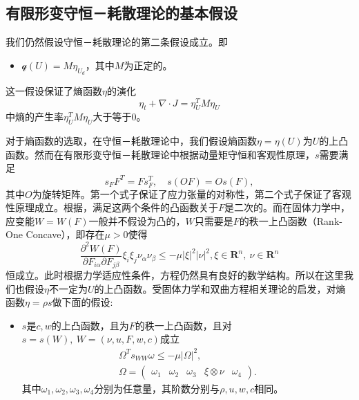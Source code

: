\subsection{有限形变守恒－耗散理论的基本假设}
我们仍然假设守恒－耗散理论的第二条假设成立。即
\begin{itemize}
	\item $\mathcal{q}(U) = M \eta_{U_d}$，其中$M$为正定的。
\end{itemize}
这一假设保证了熵函数$\eta$的演化
\begin{equation}\label{eq:entropypro}
	\eta_t + \nabla \cdot J = \eta_U^T M \eta_U
\end{equation}
中熵的产生率$\eta_U^T M \eta_U$大于等于$0$。

对于熵函数的选取，在守恒－耗散理论中，我们假设熵函数$\eta=\eta(U)$为$U$的上凸函数。然而在有限形变守恒－耗散理论中根据动量矩守恒和客观性原理，$s$需要满足
\begin{equation}\label{eq:sObjective}
	s_F F^T = F s^T_F, \quad s(OF) = O s(F),
\end{equation}
其中$O$为旋转矩阵\cite{dafermos2013non}。第一个式子保证了应力张量的对称性，第二个式子保证了客观性原理成立。根据\cite{ball1976convexity}，满足这两个条件的凸函数关于$F$是二次的。而在固体力学中，应变能$W=W(F)$一般并不假设为凸的，$W$只需要是$F$的秩一上凸函数（Rank-One Concave），即存在$\mu>0$使得
\begin{equation*}
	\frac{\partial^2 W(F)}{\partial F_{i\alpha} \partial F_{j\beta}} \xi_i \xi_j \nu_\alpha \nu_\beta \le -\mu |\xi|^2 |\nu|^2, \xi \in \mathbf{R}^n, \ \nu \in \mathbf{R}^n
\end{equation*}
恒成立。此时根据力学适应性条件，方程仍然具有良好的数学结构。所以在这里我们也假设$\eta$不一定为$U$的上凸函数。受固体力学和双曲方程相关理论的启发，对熵函数$\eta = \rho s$做下面的假设:
\begin{itemize}
	\item $s$是$c,w$的上凸函数，且为$F$的秩一上凸函数，且对$s=s(W),\ W= (\nu,u,F,w,c)$成立
\begin{eqnarray}
	\Omega^T s_{WW} \omega \le -\mu |\Omega|^2, \label{eq:FCDFconvex}\\ 
	\Omega = \left( \begin{array}{cccccc}
		\omega_1 & \omega_2 & \omega_3 & \xi \otimes \nu & \omega_4
	\end{array}\right). \nonumber
\end{eqnarray}
其中$\omega_1,\omega_2,\omega_3,\omega_4$分别为任意量，其阶数分别与$\rho, u, w,c$相同。
\end{itemize}


